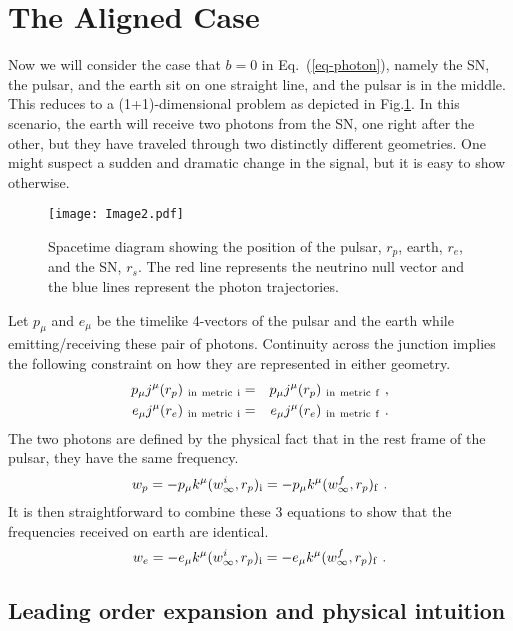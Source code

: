 \documentclass[aps,showpacs,twocolumn,floats,prd,superscriptaddress,nofootinbib]{revtex4-1}
\begin{document}
\section{The Aligned Case}
\label{sec-1+1}

Now we will consider the case that $b=0$ in Eq.~(\ref{eq-photon}), namely the SN, the pulsar, and the earth sit on one straight line, and the pulsar is in the middle. This reduces to a (1+1)-dimensional problem as depicted in Fig.\ref{fig:1}. In this scenario, the earth will receive two photons from the SN, one right after the other, but they have traveled through two distinctly different geometries. One might suspect a sudden and dramatic change in the signal, but it is easy to show otherwise.

\begin{figure}[tb!]
\begin{center}
\texttt{[image: Image2.pdf]}
\caption{Spacetime diagram showing the position of the pulsar, $r_p$, earth, $r_e$, and the SN, $r_s$. The red line represents the neutrino null vector and the blue lines represent the photon trajectories.}
\label{fig:1}
\end{center}
\end{figure}

Let $p_\mu$ and $e_\mu$ be the timelike 4-vectors of the pulsar and the earth while emitting/receiving these pair of photons. Continuity across the junction implies the following constraint on how they are represented in either geometry.
\begin{eqnarray}
p_\mu j^\mu(r_p)_{\rm \ in \ metric \ i} &=& 
p_\mu j^\mu(r_p)_{\rm \ in \ metric \ f}~,
\label{eq-JuncPuls} \\ 
e_\mu j^\mu(r_e)_{\rm \ in \ metric \ i} &=& 
e_\mu j^\mu(r_e)_{\rm \ in \ metric \ f}~.
\end{eqnarray}
The two photons are defined by the physical fact that in the rest frame of the pulsar, they have the same frequency.
\begin{equation}
w_p = -p_\mu k^\mu(w^i_\infty, r_p)_{\rm i} = 
-p_\mu k^\mu(w^f_\infty, r_p)_{\rm f}~.
\label{eq-PulsEmit}
\end{equation}
It is then straightforward to combine these 3 equations to show that the frequencies received on earth are identical.
\begin{equation}
w_e = -e_\mu k^\mu(w^i_\infty, r_p)_{\rm i} = 
-e_\mu k^\mu(w^f_\infty, r_p)_{\rm f}~.
\end{equation}

\subsection{Leading order expansion and physical intuition}
\end{document}
